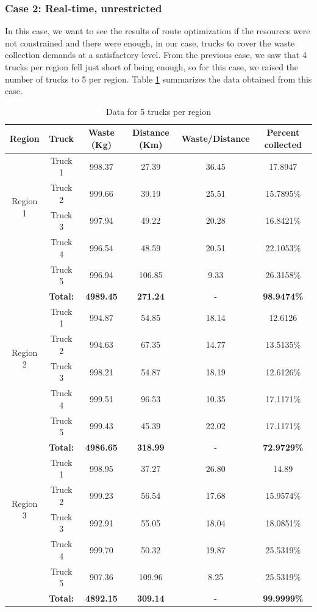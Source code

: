 \documentclass[12pt]{article}
\begin{document}
\subsubsection*{Case 2: Real-time, unrestricted}

In this case, we want to see the results of route optimization if the resources were not constrained and there were enough, in our case, trucks to cover the waste collection demands at a satisfactory level. From the previous case, we saw that 4 trucks per region fell just short of being enough, so for this case, we raised the number of trucks to 5 per region. Table \ref{tab3} summarizes the data obtained from this case.

\begin{table}[H]
    \centering
    \caption{ Data for 5 trucks per region} \label{tab3}
    \vspace*{0.3cm}
    \begin{tabular}{|c|c|c|c|c|c|}
        \hline Region & Truck & Waste (Kg) & Distance (Km) & Waste/Distance & Percent collected \\
        \hline \multirow{4}{*}{Region 1} & Truck 1 &998.37  &27.39  & 36.45 &17.8947 \\
        \cline{2-6}& Truck 2 &999.66&39.19&25.51&15.7895\%\\        
        \cline{2-6}& Truck 3 &997.94&49.22&20.28&16.8421\%\\        
        \cline{2-6}& Truck 4 &996.54&48.59&20.51&22.1053\%\\
        \cline{2-6}& Truck 5 &996.94&106.85&9.33&26.3158\%\\
        \hline &\textbf{Total:} &\textbf{4989.45} &\textbf{271.24} &- &\textbf{98.9474\%}\\
        \hline \multirow{4}{*}{Region 2} & Truck 1 &994.87  &54.85  &18.14  &12.6126 \\
        \cline{2-6}& Truck 2 &994.63&67.35&14.77&13.5135\%\\        
        \cline{2-6}& Truck 3 &998.21&54.87&18.19&12.6126\%\\        
        \cline{2-6}& Truck 4 &999.51&96.53&10.35&17.1171\%\\      
        \cline{2-6}& Truck 5 &999.43&45.39&22.02&17.1171\%\\
        \hline &\textbf{Total:} &\textbf{4986.65} &\textbf{318.99} &- &\textbf{72.9729\%}\\     
        \hline \multirow{4}{*}{Region 3} & Truck 1 &998.95  &37.27  &26.80  &14.89 \\
        \cline{2-6}& Truck 2 &999.23&56.54&17.68&15.9574\%\\        
        \cline{2-6}& Truck 3 &992.91&55.05&18.04&18.0851\%\\        
        \cline{2-6}& Truck 4 &999.70&50.32&19.87&25.5319\%\\
        \cline{2-6}& Truck 5 &907.36&109.96&8.25&25.5319\%\\
        \hline &\textbf{Total:} &\textbf{4892.15} &\textbf{309.14}&- &\textbf{99.9999\%}\\
        \hline      
    \end{tabular}
\end{table}
\end{document}
